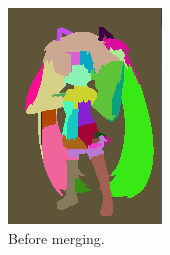 \documentclass{beamer}
\begin{document}
\begin{frame}
\begin{figure}[htb!]
\begin{subfigure}{0.3\textwidth}
\includegraphics[width=\textwidth]{../images/miku_seg_initial.png}
\caption{Before merging.}
\end{subfigure}
\begin{subfigure}{0.3\textwidth}

\end{subfigure}
\end{figure}
\end{frame}
\end{document}
